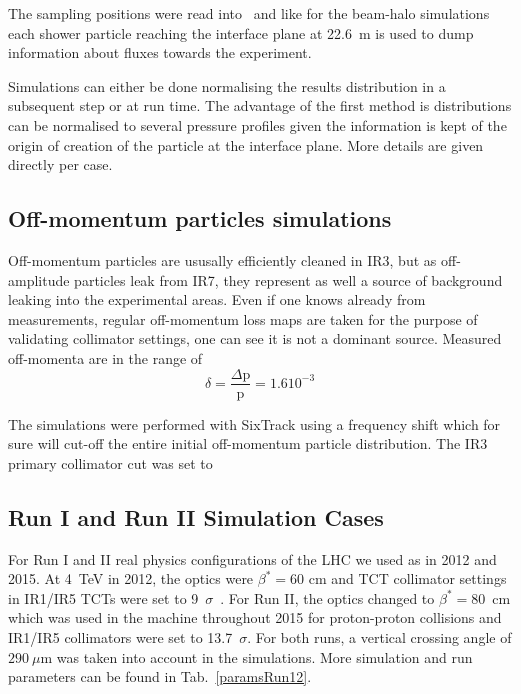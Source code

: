 The sampling positions were read into \fluka~and like for the beam-halo simulations each shower particle reaching the interface plane at 22.6~m is used to dump information about fluxes towards the experiment. 

Simulations can either be done normalising the results distribution in a subsequent step or at run time. The advantage of the first method is distributions can be normalised to several pressure profiles given the information is kept of the origin of creation of the particle at the interface plane. More details are given directly per case.%


\subsection{Off-momentum particles simulations}
Off-momentum particles are ususally efficiently cleaned in IR3, but as off-amplitude particles leak from IR7, they represent as well a source of background leaking into the experimental areas. Even if one knows already from measurements, regular off-momentum loss maps are taken for the purpose of validating collimator settings, one can see it is not a dominant source. Measured off-momenta are in the range of
\begin{equation}
  \delta = \frac{\Delta \mathrm{p}}{\mathrm{p}} = 1.6 10^{-3}
\end{equation}

The simulations were performed with SixTrack using a frequency shift which for sure will cut-off the entire initial off-momentum particle distribution. The IR3 primary collimator cut was set to 
\subsection{Run I and Run II Simulation Cases}
For Run I and II real physics configurations of the LHC we used as in 2012 and 2015. At 4~TeV in 2012, the optics were $\beta^* = 60$ cm and TCT collimator settings in IR1/IR5 TCTs were set to 9~$\sigma$~\cite{parametersRun1}. For Run II, the optics changed to $\beta^* = 80$~cm which was used in the machine throughout 2015 for proton-proton collisions and IR1/IR5 collimators were set to 13.7~$\sigma$. For both runs, a vertical crossing angle of $290~\mu$m was taken into account in the simulations. More simulation and run parameters can be found in Tab.~\ref{paramsRun12}. 


